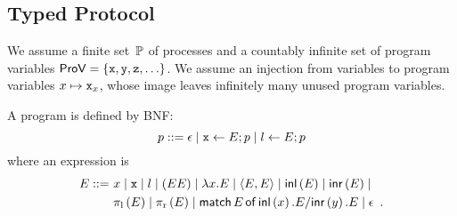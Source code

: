 {\subsection{Typed Protocol}

We assume a finite set~$\mathbb{P}$
of processes and a countably infinite
set of program variables $\mathsf{ProV} =\{\texttt{x}, \texttt{y}, \texttt{z}, \ldots\}$.
We assume an injection from variables to program variables $x\mapsto
\texttt{x}_x$, whose image leaves infinitely many unused program variables.

A program is defined by BNF:
\[
 p ::= \epsilon\mid
 \texttt{x}\leftarrow E; p \mid
 l \leftarrow E; p
\]
where an expression is
\begin{align*}
 E
 ::=\,\,
 &x\mid \texttt{x} \mid l \mid (EE)\mid \lambda
 x.E\mid \langle{E,E}\rangle\mid \mathsf{inl}\left({E}\right)\mid \mathsf{inr}\left({E}\right)\mid \\
 &\pi_{\mathrm l}\left({E}\right)\mid\pi_{\mathrm r}\left({E}\right)\mid  \mathsf{match}\,{E}\,\mathsf{of}\, \mathsf{inl}\left({x}\right). {E}/ \mathsf{inr}\left({y}\right). {E}\mid \epsilon\enspace.
\end{align*}

}
